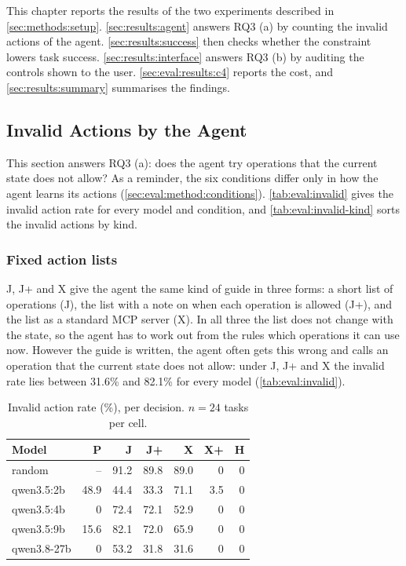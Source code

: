 This chapter reports the results of the two experiments described in \autoref{sec:methods:setup}.
\autoref{sec:results:agent} answers RQ3 (a) by counting the invalid actions of the agent.
\autoref{sec:results:success} then checks whether the constraint lowers task success.
\autoref{sec:results:interface} answers RQ3 (b) by auditing the controls shown to the user.
\autoref{sec:eval:results:c4} reports the cost, and \autoref{sec:results:summary} summarises the findings.

\subsection{Invalid Actions by the Agent}\label{sec:results:agent}

This section answers RQ3 (a): does the agent try operations that the current state does not allow?
As a reminder, the six conditions differ only in how the agent learns its actions (\autoref{sec:eval:method:conditions}).
\autoref{tab:eval:invalid} gives the invalid action rate for every model and condition, and \autoref{tab:eval:invalid-kind} sorts the invalid actions by kind.

\subsubsection{Fixed action lists}\label{sec:eval:results:c1}

J, J+ and X give the agent the same kind of guide in three forms: a short list of operations (J), the list with a note on when each operation is allowed (J+), and the list as a standard MCP server (X).
In all three the list does not change with the state, so the agent has to work out from the rules which operations it can use now.
However the guide is written, the agent often gets this wrong and calls an operation that the current state does not allow: under J, J+ and X the invalid rate lies between 31.6\% and 82.1\% for every model (\autoref{tab:eval:invalid}).

\begin{table}[htbp]
\centering
\caption{Invalid action rate (\%), per decision. $n = 24$ tasks per cell.}
\label{tab:eval:invalid}
\begin{tabular}{lrrrrrr}
\hline
Model & P & J & J+ & X & X+ & H \\
\hline
random & -- & 91.2 & 89.8 & 89.0 & 0 & 0 \\
qwen3.5:2b & 48.9 & 44.4 & 33.3 & 71.1 & 3.5 & 0 \\
qwen3.5:4b & 0 & 72.4 & 72.1 & 52.9 & 0 & 0 \\
qwen3.5:9b & 15.6 & 82.1 & 72.0 & 65.9 & 0 & 0 \\
qwen3.8-27b & 0 & 53.2 & 31.8 & 31.6 & 0 & 0 \\
\hline
\end{tabular}
\end{table}

